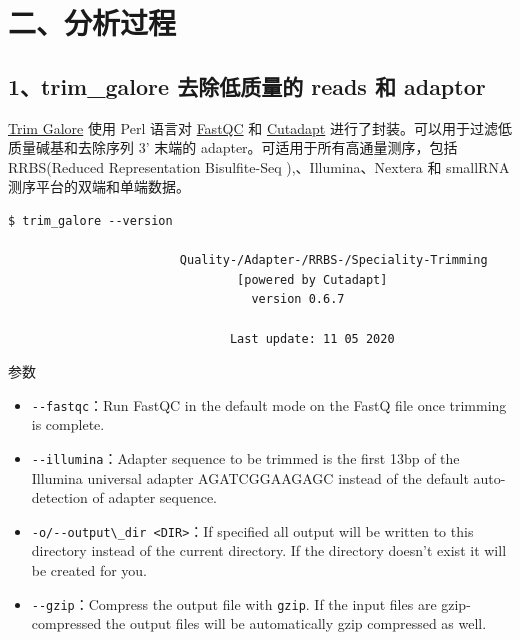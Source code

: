 \documentclass[
  a4paper,
]{article}
\newcommand{\passthrough}[1]{#1}
\providecommand{\tightlist}{%
  \setlength{\itemsep}{0pt}\setlength{\parskip}{0pt}}\usepackage{longtable,booktabs,array}
\begin{document}
\hypertarget{ux4e8cux5206ux6790ux8fc7ux7a0b}{%
\section{二、分析过程}\label{ux4e8cux5206ux6790ux8fc7ux7a0b}}

\hypertarget{trim_galore-ux53bbux9664ux4f4eux8d28ux91cfux7684-reads-ux548c-adaptor}{%
\subsection{1、trim\_galore 去除低质量的 reads 和
adaptor}\label{trim_galore-ux53bbux9664ux4f4eux8d28ux91cfux7684-reads-ux548c-adaptor}}

\href{https://github.com/FelixKrueger/TrimGalore}{Trim Galore} 使用 Perl
语言对
\href{https://www.bioinformatics.babraham.ac.uk/projects/fastqc/}{FastQC}
和 \href{https://github.com/marcelm/cutadapt}{Cutadapt}
进行了封装。可以用于过滤低质量碱基和去除序列 3' 末端的
adapter。可适用于所有高通量测序，包括 RRBS(Reduced Representation
Bisulfite-Seq ),、Illumina、Nextera 和 smallRNA
测序平台的双端和单端数据。

\begin{lstlisting}
$ trim_galore --version

                        Quality-/Adapter-/RRBS-/Speciality-Trimming
                                [powered by Cutadapt]
                                  version 0.6.7

                               Last update: 11 05 2020
\end{lstlisting}

参数

\begin{itemize}
\tightlist
\item
  \passthrough{\lstinline!--fastqc!}：Run FastQC in the default mode on
  the FastQ file once trimming is complete.
\item
  \passthrough{\lstinline!--illumina!}：Adapter sequence to be trimmed
  is the first 13bp of the Illumina universal adapter AGATCGGAAGAGC
  instead of the default auto-detection of adapter sequence.
\item
  \passthrough{\lstinline!-o/--output\_dir <DIR>!}：If specified all
  output will be written to this directory instead of the current
  directory. If the directory doesn't exist it will be created for you.
\item
  \passthrough{\lstinline!--gzip!}：Compress the output file with
  \passthrough{\lstinline!gzip!}. If the input files are gzip-compressed
  the output files will be automatically gzip compressed as well.
\end{itemize}
\end{document}

